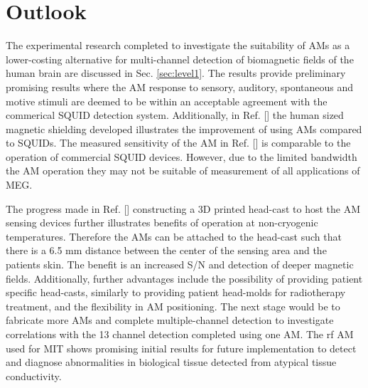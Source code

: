 \section{Outlook}

The experimental research completed to investigate the suitability of AMs as a lower-costing alternative for multi-channel detection of biomagnetic fields of the human brain are discussed in Sec. \ref{sec:level1}. The results provide preliminary promising results where the AM response to sensory, auditory, spontaneous and motive stimuli are deemed to be within an acceptable agreement with the commerical SQUID detection system. Additionally, in Ref. [] the human sized magnetic shielding developed illustrates the improvement of using AMs compared to SQUIDs. The measured sensitivity of the AM in Ref. [] is comparable to the operation of commercial SQUID devices. However, due to the limited bandwidth the AM operation they may not be suitable of measurement of all applications of MEG. 

The progress made in Ref. [] constructing a 3D printed head-cast to host the AM sensing devices further illustrates benefits of operation at non-cryogenic temperatures. Therefore the AMs can be attached to the head-cast such that there is a 6.5 mm distance between the center of the sensing area and the patients skin. The benefit is an increased S/N and detection of deeper magnetic fields. Additionally, further advantages include the possibility of providing patient specific head-casts, similarly to providing patient head-molds for radiotherapy treatment, and the flexibility in AM positioning. The next stage would be to fabricate more AMs and complete multiple-channel detection to investigate correlations with the 13 channel detection completed using one AM. The rf AM used for MIT shows promising initial results for future implementation to detect and diagnose abnormalities in biological tissue detected from atypical tissue conductivity.   
  
  



